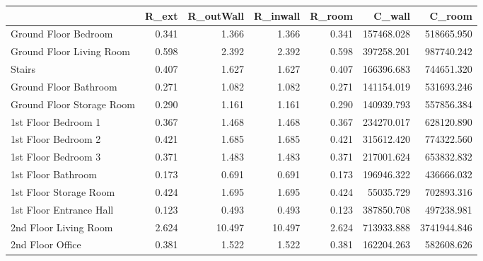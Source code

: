 \begin{tabular}{lrrrrrr}
\toprule
{} &  R\_ext &  R\_outWall &  R\_inwall &  R\_room &     C\_wall &      C\_room \\
\midrule
Ground Floor Bedroom      &  0.341 &      1.366 &     1.366 &   0.341 & 157468.028 &  518665.950 \\
Ground Floor Living Room  &  0.598 &      2.392 &     2.392 &   0.598 & 397258.201 &  987740.242 \\
Stairs                    &  0.407 &      1.627 &     1.627 &   0.407 & 166396.683 &  744651.320 \\
Ground Floor Bathroom     &  0.271 &      1.082 &     1.082 &   0.271 & 141154.019 &  531693.246 \\
Ground Floor Storage Room &  0.290 &      1.161 &     1.161 &   0.290 & 140939.793 &  557856.384 \\
1st Floor Bedroom 1       &  0.367 &      1.468 &     1.468 &   0.367 & 234270.017 &  628120.890 \\
1st Floor Bedroom 2       &  0.421 &      1.685 &     1.685 &   0.421 & 315612.420 &  774322.560 \\
1st Floor Bedroom 3       &  0.371 &      1.483 &     1.483 &   0.371 & 217001.624 &  653832.832 \\
1st Floor Bathroom        &  0.173 &      0.691 &     0.691 &   0.173 & 196946.322 &  436666.032 \\
1st Floor Storage Room    &  0.424 &      1.695 &     1.695 &   0.424 &  55035.729 &  702893.316 \\
1st Floor Entrance Hall   &  0.123 &      0.493 &     0.493 &   0.123 & 387850.708 &  497238.981 \\
2nd Floor Living Room     &  2.624 &     10.497 &    10.497 &   2.624 & 713933.888 & 3741944.846 \\
2nd Floor Office          &  0.381 &      1.522 &     1.522 &   0.381 & 162204.263 &  582608.626 \\
\bottomrule
\end{tabular}
